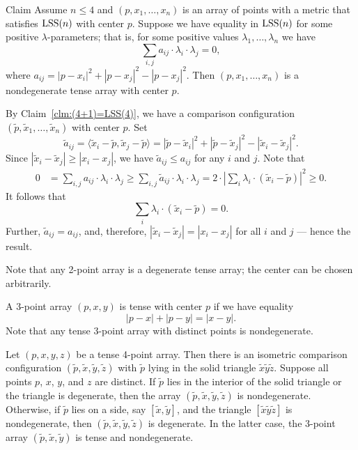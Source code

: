 \documentclass{article}
\begin{document}
\begin{thm}{Claim}\label{clm:nondeg-tense}
Assume $n\le 4$ and $(p,x_1,\dots,x_n)$ is an array of points with a metric that satisfies $\mathrm{LSS}(n)$ with center $p$.
Suppose we have equality in $\mathrm{LSS}(n)$ for some positive $\lambda$-parameters;
that is, for some positive values $\lambda_1,\dots,\lambda_n$ we have
\[\sum_{i,j}a_{ij}\cdot \lambda_i\cdot\lambda_j= 0,\]
where $a_{ij}=|p-x_i|^2+|p-x_j|^2-|p-x_j|^2$.
Then $(p,x_1,\dots,x_n)$ is a nondegenerate tense array with center $p$.
\end{thm}

By Claim~\ref{clm:(4+1)=LSS(4)}, we have a comparison configuration $(\tilde p,\tilde x_1,\dots,\tilde x_n)$ with center $p$.
Set 
\[\tilde a_{ij}
=
\langle\tilde x_i-\tilde p,\tilde x_j-\tilde p\rangle
=
|\tilde p-\tilde x_i|^2+|\tilde p-\tilde x_j|^2-|\tilde x_i-\tilde x_j|^2.\]
Since $|\tilde x_i-\tilde x_j|\ge| x_i- x_j|$, we have $\tilde a_{ij}\le a_{ij}$ for any $i$ and $j$.
Note that 
\begin{align*}
0&=\sum_{i,j}a_{ij}\cdot \lambda_i\cdot\lambda_j\ge
\sum_{i,j}\tilde a_{ij}\cdot \lambda_i\cdot\lambda_j= 
2\cdot\left|\sum_i\lambda_i\cdot (\tilde x_i-\tilde p)\right|^2\ge 
0.
\end{align*}
It follows that 
\[\sum_i\lambda_i\cdot (\tilde x_i-\tilde p)=0.\]
Further, $\tilde a_{ij}= a_{ij}$, and, therefore, $|\tilde x_i-\tilde x_j|=| x_i- x_j|$ for all $i$ and $j$ --- hence the result.
\qeds

Note that any 2-point array is a degenerate tense array; the center can be chosen arbitrarily.

A 3-point array $(p,x,y)$ is tense with center $p$ if we have equality 
\[|p-x|+|p-y|=|x-y|.\]
Note that any tense 3-point array with distinct points is nondegenerate.

Let $(p,x,y,z)$ be a tense 4-point array.
Then there is an isometric comparison configuration $(\tilde p,\tilde x,\tilde y,\tilde z)$ with $\tilde p$ lying in the solid triangle $\tilde x\tilde y\tilde z$.
Suppose all points $p$, $x$, $y$, and $z$ are distinct.
If $\tilde p$ lies in the interior of the solid triangle or the triangle is degenerate, then the array $(\tilde p,\tilde x,\tilde y,\tilde z)$ is nondegenerate.
Otherwise, if $\tilde p$ lies on a side, say $[\tilde x,\tilde y]$, and the triangle $[\tilde x\tilde y\tilde z]$ is nondegenerate, then $(\tilde p,\tilde x,\tilde y,\tilde z)$ is degenerate.
In the latter case, the 3-point array $(\tilde p,\tilde x,\tilde y)$ is tense and nondegenerate.
\end{document}
